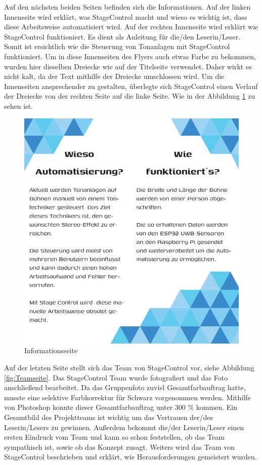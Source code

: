 \newpage
Auf den nächsten beiden Seiten befinden sich die Informationen. Auf der linken Innenseite wird erklärt, was StageControl macht und wieso es wichtig ist, dass diese Arbeitsweise automatisiert wird. Auf der rechten Innenseite wird erklärt wie StageControl funktioniert. Es dient als Anleitung für die/den Leserin/Leser. Somit ist ersichtlich wie die Steuerung von Tonanlagen mit StageControl funktioniert. Um in diese Innenseiten des Flyers auch etwas Farbe zu bekommen, wurden hier dieselben Dreiecke wie auf der Titelseite verwendet. Daher wirkt es nicht kalt, da der Text mithilfe der Dreiecke umschlossen wird. Um die Innenseiten ansprechender zu gestalten, überlegte sich StageControl einen Verlauf der Dreiecke von der rechten Seite auf die linke Seite. Wie in der Abbildung \ref{fig:Informationsseite} zu sehen ist.

\begin{figure}[H]
	\centering
	\includegraphics[width=0.5\linewidth]{images/Informationsseite.png}
	\caption[Informationsseite]{Informationsseite}
	\label{fig:Informationsseite}
\end{figure} 

\newpage
Auf der letzten Seite stellt sich das Team von StageControl vor, siehe Abbildung \ref{fig:Teamseite}. Das StageControl Team wurde fotografiert und das Foto anschließend bearbeitet. Da das Gruppenfoto zuviel Gesamtfarbauftrag hatte, musste eine selektive Farbkorrektur für Schwarz vorgenommen werden. Mithilfe von Photoshop konnte dieser Gesamtfarbauftrag unter 300 \% kommen. Ein Gesamtbild des Projektteams ist wichtig um das Vertrauen der/des Leserin/Lesers zu gewinnen. Außerdem bekommt die/der Leserin/Leser einen ersten Eindruck vom Team und kann so schon feststellen, ob das Team sympathisch ist, sowie ob das Konzept zusagt. Weiters wird das Team von StageControl beschrieben und erklärt, wie Herausforderungen gemeistert wurden.

